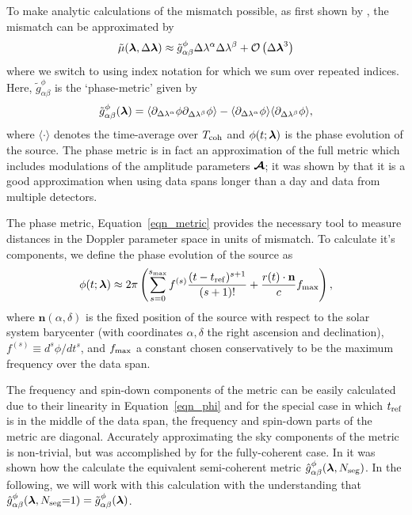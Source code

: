 \documentclass[aps, prd, twocolumn, superscriptaddress, floatfix, showpacs, nofootinbib, longbibliography]{revtex4-1}
\begin{document}
To make analytic calculations of the mismatch possible, as first shown by
\citet{brady1998}, the mismatch can be approximated by
\begin{equation}
\tilde{\mu}(\boldsymbol{\mathbf{\lambda}}, \Delta\boldsymbol{\mathbf{\lambda}}) \approx 
\tilde{g}_{\alpha \beta}^{\phi} \Delta\lambda^{\alpha}\Delta\lambda^{\beta}
+ \mathcal{O}\left(\Delta\boldsymbol{\mathbf{\lambda}}^{3}\right)
\end{equation}
where we switch to using index notation for which we sum over repeated indices.
Here, $\tilde{g}_{\alpha\beta}^{\phi}$ is the `phase-metric' given by
\begin{align}
\tilde{g}^{\phi}_{\alpha \beta}(\boldsymbol{\mathbf{\lambda}}) = 
\langle 
\partial_{\Delta\lambda^{\alpha}}\phi
\partial_{\Delta\lambda^{\beta}}\phi
\rangle
-
\langle 
\partial_{\Delta\lambda^{\alpha}}\phi
\rangle
\langle
\partial_{\Delta\lambda^{\beta}}\phi
\rangle,
\label{eqn_metric}
\end{align}
where $\langle \cdot \rangle$ denotes the time-average over $T_{\rm coh}$ and
$\phi(t; \boldsymbol{\mathbf{\lambda}})$ is the phase evolution of the source. The phase metric is
in fact an approximation of the full metric which includes modulations of the
amplitude parameters $\boldsymbol{\mathcal{A}}$; it was shown by \citet{prix2007metric} that it is a
good approximation when using data spans longer than a day and data from
multiple detectors. 

The phase metric, Equation~\eqref{eqn_metric} provides the necessary tool to
measure distances in the Doppler parameter space in units of mismatch. To
calculate it's components, we define the phase evolution
of the source as \citep{wette2015}
\begin{align}
\phi(t; \boldsymbol{\mathbf{\lambda}}) \approx 2\pi\left(
\sum_{s=0}^{s_{\textrm{max}}} f^{(s)}\frac{(t-t_{\rm ref})^{s+1}}{(s+1)!}
+ \frac{r(t)\cdot\mathbf{n}}{c} f_{\textrm{max}}\right),
\label{eqn_phi}
\end{align}
where $\mathbf{n}(\alpha, \delta)$ is the fixed position of the source with
respect to the solar system barycenter (with coordinates $\alpha, \delta$ the
right ascension and declination), $f^(s)\equiv d^{s}\phi/dt^s$, and $f_{\textrm{max}}$
a constant chosen conservatively to be the maximum frequency over the data
span.

The frequency and spin-down components of the metric can be easily calculated
due to their linearity in Equation~\eqref{eqn_phi} and for the special case in
which $t_{\rm ref}$ is in the middle of the data span, the frequency and spin-down
parts of the metric are diagonal. Accurately approximating the sky components
of the metric is non-trivial, but was accomplished by \citet{wette2013} for the
fully-coherent case. In \citet{wette2015} it was shown how the calculate the
equivalent semi-coherent metric $\hat{g}_{\alpha\beta}^{\phi}(\boldsymbol{\mathbf{\lambda}},
N_{\rm seg})$.  In the following, we will work with this calculation with the
understanding that $\hat{g}_{\alpha\beta}^{\phi}(\boldsymbol{\mathbf{\lambda}}, N_{\rm seg}{=}1)=
\tilde{g}_{\alpha\beta}^{\phi}(\boldsymbol{\mathbf{\lambda}})$.
\end{document}
